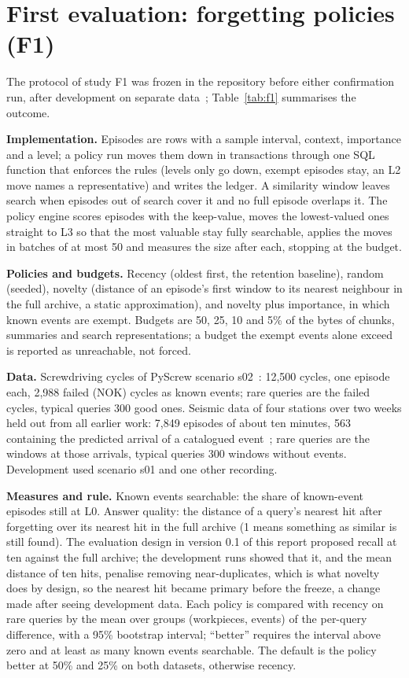 \documentclass[sigconf,nonacm]{acmart}
\begin{document}
\section{First evaluation: forgetting policies (F1)}\label{sec:eval}
The protocol of study F1 was frozen in the repository before either confirmation run, after development on separate data~\cite{f1}; Table~\ref{tab:f1} summarises the outcome.

\textbf{Implementation.} Episodes are rows with a sample interval, context, importance and a level; a policy run moves them down in transactions through one SQL function that enforces the rules (levels only go down, exempt episodes stay, an L2 move names a representative) and writes the ledger. A similarity window leaves search when episodes out of search cover it and no full episode overlaps it. The policy engine scores episodes with the keep-value, moves the lowest-valued ones straight to L3 so that the most valuable stay fully searchable, applies the moves in batches of at most 50 and measures the size after each, stopping at the budget.

\textbf{Policies and budgets.} Recency (oldest first, the retention baseline), random (seeded), novelty (distance of an episode's first window to its nearest neighbour in the full archive, a static approximation), and novelty plus importance, in which known events are exempt. Budgets are 50, 25, 10 and 5\% of the bytes of chunks, summaries and search representations; a budget the exempt events alone exceed is reported as unreachable, not forced.

\textbf{Data.} Screwdriving cycles of PyScrew scenario s02~\cite{pyscrew}: 12,500 cycles, one episode each, 2,988 failed (NOK) cycles as known events; rare queries are the failed cycles, typical queries 300 good ones. Seismic data of four stations over two weeks held out from all earlier work: 7,849 episodes of about ten minutes, 563 containing the predicted arrival of a catalogued event~\cite{morletdb}; rare queries are the windows at those arrivals, typical queries 300 windows without events. Development used scenario s01 and one other recording.

\textbf{Measures and rule.} Known events searchable: the share of known-event episodes still at L0. Answer quality: the distance of a query's nearest hit after forgetting over its nearest hit in the full archive (1 means something as similar is still found). The evaluation design in version 0.1 of this report proposed recall at ten against the full archive; the development runs showed that it, and the mean distance of ten hits, penalise removing near-duplicates, which is what novelty does by design, so the nearest hit became primary before the freeze, a change made after seeing development data. Each policy is compared with recency on rare queries by the mean over groups (workpieces, events) of the per-query difference, with a 95\% bootstrap interval; ``better'' requires the interval above zero and at least as many known events searchable. The default is the policy better at 50\% and 25\% on both datasets, otherwise recency.
\end{document}
